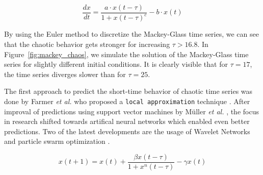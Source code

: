 \documentclass{article}
\begin{document}
\begin{equation}
    \frac{dx}{dt} = \frac{a \cdot x(t - \tau)}{1 + x(t - \tau)^c} - b \cdot x(t)
    \label{equ:mackey}
\end{equation}

By using the Euler method to discretize the Mackey-Glass time series, we can
see that the chaotic behavior gets stronger for increasing $\tau > 16.8$. In
Figure~\ref{fig:mackey_chaos}, we simulate the solution of the Mackey-Glass
time series for slightly different initial conditions. It is clearly visible
that for $\tau = 17$, the time series diverges slower than for $\tau = 25$.

The first approach to predict the short-time behavior of chaotic time series
was done by Farmer \textit{et al.} who proposed a \texttt{local approximation}
technique \cite{farmer1987}. After improval of predictions using support vector
machines by Müller \textit{et al.} \cite{muller1997}, the focus in research
shifted towards artifical neural networks which enabled even better predictions.
Two of the latest developments are the usage of Wavelet Networks
\cite{alexandridis2013} and particle swarm optimization \cite{caraballo2016}.

\begin{equation}
    x(t+1) = x(t) + \frac{\beta x(t - \tau)}{1 + x^{n}(t - \tau)} - \gamma x(t)
    \label{equ:mackey_euler}
\end{equation}
\end{document}
